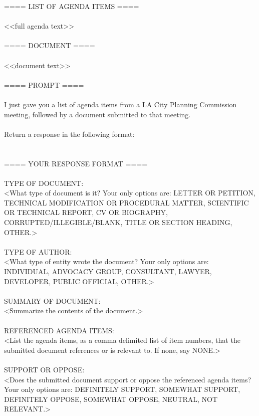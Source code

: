 ==== LIST OF AGENDA ITEMS ====\\ 
\\ 
<<full agenda text>>\\ 
\\ 
==== DOCUMENT ====\\ 
\\ 
<<document text>>\\ 
\\ 
==== PROMPT ====\\ 
\\ 
I just gave you a list of agenda items from a LA City Planning Commission meeting, followed by a document submitted to that meeting. \\ 
\\ 
Return a response in the following format:\\ 
\\ 
\\ 
==== YOUR RESPONSE FORMAT ====\\ 
\\ 
TYPE OF DOCUMENT:\\ 
<What type of document is it? Your only options are: LETTER OR PETITION, TECHNICAL MODIFICATION OR PROCEDURAL MATTER, SCIENTIFIC OR TECHNICAL REPORT, CV OR BIOGRAPHY, CORRUPTED/ILLEGIBLE/BLANK, TITLE OR SECTION HEADING, OTHER.>\\ 
\\ 
TYPE OF AUTHOR:\\ 
<What type of entity wrote the document? Your only options are: INDIVIDUAL, ADVOCACY GROUP, CONSULTANT, LAWYER, DEVELOPER, PUBLIC OFFICIAL, OTHER.>\\ 
\\ 
SUMMARY OF DOCUMENT:\\ 
<Summarize the contents of the document.>\\ 
\\ 
REFERENCED AGENDA ITEMS:\\ 
<List the agenda items, as a comma delimited list of item numbers, that the submitted document references or is relevant to. If none, say NONE.>\\ 
\\ 
SUPPORT OR OPPOSE:\\ 
<Does the submitted document support or oppose the referenced agenda items? Your only options are: DEFINITELY SUPPORT, SOMEWHAT SUPPORT, DEFINITELY OPPOSE, SOMEWHAT OPPOSE, NEUTRAL, NOT RELEVANT.>